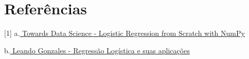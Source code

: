 \documentclass[12pt]{article}
\begin{document}
\newpage
\section{Referências}

[1] a.\href{https://towardsdatascience.com/logistic-regression-from-scratch-with-numpy-da4cc3121ece}{ Towards Data Science - Logistic Regression from Scratch with NumPy}

\noindent [2] b.\href{https://monografias.ufma.br/jspui/bitstream/123456789/3572/1/LEANDRO-GONZALEZ.pdf}{ Leando Gonzales - Regressão Logística e suas aplicações}
\end{document}
